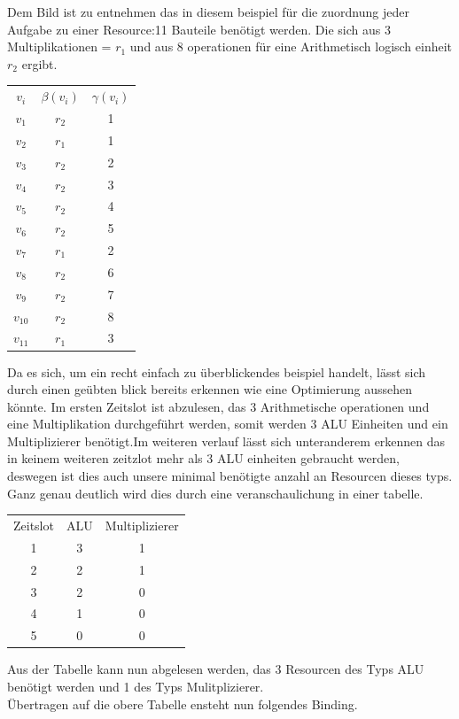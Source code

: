 \documentclass[conference]{IEEEtran}
\begin{document}
Dem Bild ist zu entnehmen das in diesem beispiel für die zuordnung jeder Aufgabe zu einer Resource:11 Bauteile benötigt werden.
 Die sich aus 3 Multiplikationen = $r_1$ und aus 8 operationen für eine Arithmetisch logisch einheit $r_2$ ergibt.\\
 \begin{center}
\begin{tabular}[h]{ccc}
$v_i$&$\beta(v_i)$&$\gamma(v_i)$\\
$v_1$&$r_2$&1\\
$v_2$&$r_1$&1\\
$v_3$&$r_2$&2\\
$v_4$&$r_2$&3\\
$v_5$&$r_2$&4\\
$v_6$&$r_2$&5\\
$v_7$&$r_1$&2\\
$v_8$&$r_2$&6\\
$v_9$&$r_2$&7\\
$v_10$&$r_2$&8\\
$v_11$&$r_1$&3\\
\end{tabular}
\end{center}
Da es sich, um ein recht einfach zu überblickendes beispiel handelt, lässt sich durch einen geübten blick bereits erkennen wie eine Optimierung aussehen könnte. Im ersten Zeitslot ist abzulesen, das 3 Arithmetische operationen und eine Multiplikation durchgeführt werden, somit werden 3 ALU Einheiten und ein Multiplizierer benötigt.Im weiteren verlauf lässt sich unteranderem erkennen das in keinem weiteren zeitzlot mehr als 3 ALU einheiten gebraucht werden, deswegen ist dies auch unsere minimal benötigte anzahl an Resourcen dieses typs. Ganz genau deutlich wird dies durch eine veranschaulichung in einer tabelle.\\
\begin{center}
\begin{tabular}[h]{ccc}
Zeitslot&ALU&Multiplizierer\\
1&3&1\\
2&2&1\\
3&2&0\\
4&1&0\\
5&0&0\\
\end{tabular}
\end{center}
Aus der Tabelle kann nun abgelesen werden, das 3 Resourcen des Typs ALU benötigt werden und 1 des Typs Mulitplizierer.\\
Übertragen auf die obere Tabelle ensteht nun folgendes Binding.\\
\end{document}

